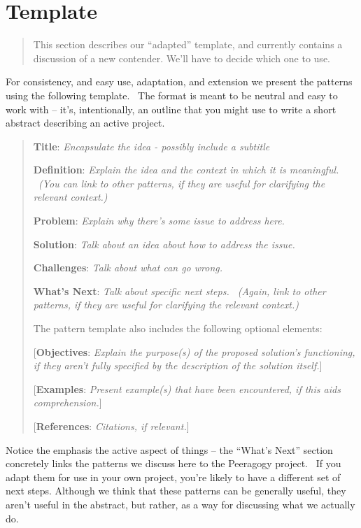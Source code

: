 \section{Template}

\begin{quote}
This section describes our ``adapted'' template, and currently contains a discussion of a new contender.  We'll have to decide which one to use.
\end{quote}

For consistency, and easy use, adaptation, and extension we present
the patterns using the following template.~ The format is meant to be
neutral and easy to work with -- it's, intentionally, an outline that
you might use to write a short abstract describing an active project.

\begin{quote}
\textbf{Title}: \emph{Encapsulate the idea - possibly include a
subtitle}

\textbf{Definition}: \emph{Explain the idea and the context in which it
is meaningful. ~(You can link to other patterns, if they are useful for
clarifying the relevant context.)}

\textbf{Problem}: \emph{Explain why there's some issue to address here.}

\textbf{Solution}: \emph{Talk about an idea about how to address the
issue.}

\textbf{Challenges}: \emph{Talk about what can go wrong.}

\textbf{What's Next}: \emph{Talk about specific next steps. ~(Again,
link to other patterns, if they are useful for clarifying the relevant
context.)}

The pattern template also includes the following optional elements:

{[}\textbf{Objectives}: \emph{Explain the purpose(s) of the proposed
solution's functioning, if they aren't fully specified by the
description of the solution itself.}{]}

{[}\textbf{Examples}: \emph{Present example(s) that have been
encountered, if this aids comprehension.}{]}

{[}\textbf{References}: \emph{Citations, if relevant.}{]}
\end{quote}

Notice the emphasis the active aspect of things -- the ``What's Next''
section concretely links the patterns we discuss here to the Peeragogy
project.~ If you adapt them for use in your own project, you're likely
to have a different set of next steps. Although we think that these
patterns can be generally useful, they aren't useful in the abstract,
but rather, as a way for discussing what we actually do.

